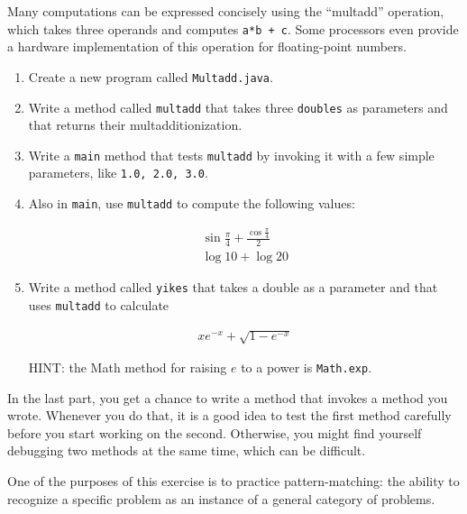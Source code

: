 \begin{exercise}
\label{ex.multadd}

Many computations can be expressed concisely using the ``multadd''
operation, which takes three operands and computes {\tt a*b + c}.  Some
processors even provide a hardware implementation of this operation for
floating-point numbers.

\begin{enumerate}

\item Create a new program called {\tt Multadd.java}.

\item Write a method called {\tt multadd} that takes three {\tt doubles}
as parameters and that returns their multadditionization.

\item Write a {\tt main} method that tests {\tt multadd} by invoking it with a
few simple parameters, like {\tt 1.0, 2.0, 3.0}.

\item Also in {\tt main}, use {\tt multadd} to compute the
following values:

\begin{eqnarray*}
& \sin \frac{\pi}{4} + \frac{\cos \frac{\pi}{4}}{2} & \\
& \log 10 + \log 20 &
\end{eqnarray*}

\item Write a method called {\tt yikes} that takes a
double as a parameter and that uses {\tt multadd} to calculate

\begin{eqnarray*}
x e^{-x} + \sqrt{1 - e^{-x}}
\end{eqnarray*}

HINT: the Math method for raising $e$ to a power is {\tt Math.exp}.

\end{enumerate}

In the last part, you get a chance to write a method that invokes
a method you wrote.  Whenever you do that, it is a good idea to
test the first method carefully before you start working on the
second.  Otherwise, you might find yourself debugging two methods
at the same time, which can be difficult.

One of the purposes of this exercise is to practice pattern-matching:
the ability to recognize a specific problem as an instance of a
general category of problems.

\end{exercise}


